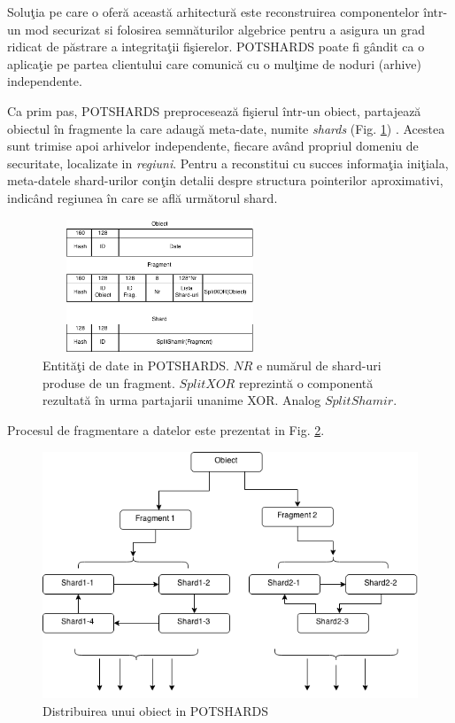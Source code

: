 \documentclass{llncs}
\begin{document}
Solu\c{t}ia pe care o ofer\u{a} aceast\u{a} arhitectur\u{a} este reconstruirea componentelor \^{i}ntr-un mod securizat si folosirea semn\u{a}turilor algebrice pentru a asigura un grad ridicat de p\u{a}strare a integrita\c{t}ii fi\c{s}ierelor.\cite{STM:2006}
POTSHARDS poate fi g\^{a}ndit ca o aplica\c{t}ie pe partea clientului care comunic\u{a} cu o mul\c{t}ime de noduri (arhive) independente.

Ca prim pas, POTSHARDS preproceseaz\u{a} fi\c{s}ierul \^{i}ntr-un obiect, partajeaz\u{a} obiectul \^{i}n fragmente la care adaug\u{a} meta-date, numite \textit{shards} (Fig. \ref{fig:data-potshard}) \cite{SGMV:2009}. Acestea sunt trimise apoi arhivelor independente, fiecare av\^{a}nd propriul domeniu de securitate, localizate in \textit{regiuni}. Pentru a reconstitui cu succes informa\c{t}ia ini\c{t}iala, meta-datele shard-urilor con\c{t}in detalii despre structura pointerilor aproximativi, indic\^{a}nd regiunea \^{i}n care se afl\u{a} urm\u{a}torul shard.

\begin{figure}
	\begin{center}
	\includegraphics[width=7cm, height=4cm]{img/Shards.png}    %
	\caption{Entit\u{a}\c{t}i de date in POTSHARDS. $NR$ e num\u{a}rul de shard-uri produse de un fragment.
		$SplitXOR$ reprezint\u{a} o component\u{a} rezultat\u{a} \^{i}n urma partajarii unanime XOR. Analog $SplitShamir$.}
	\label{fig:data-potshard}
	\bigskip
	\end{center}
\end{figure}

Procesul de fragmentare a datelor este prezentat in Fig. \ref{fig:potshards-layers}.

\begin{figure}
	\begin{center}
	\includegraphics[width=12cm]{img/POTSHARDS.png}    %
	\caption{Distribuirea unui obiect in POTSHARDS}
	\label{fig:potshards-layers}
	\bigskip
	\end{center}
\end{figure}
\end{document}
